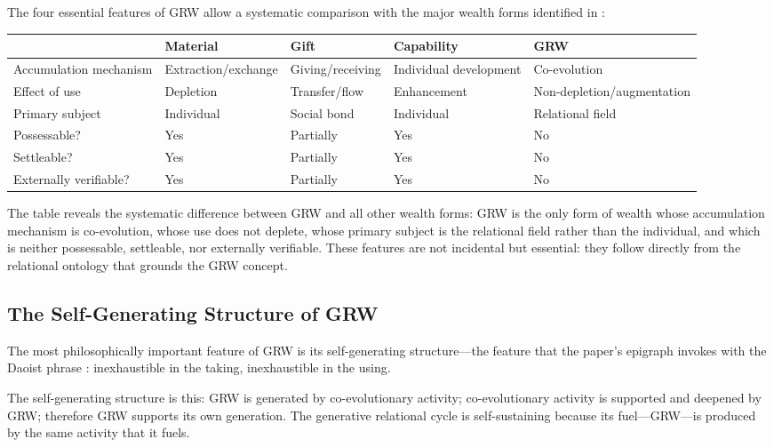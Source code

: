 \noindent
The four essential features of GRW allow a systematic comparison with the major wealth forms identified in :

\vspace{0.6em}
\begin{center}
\begin{tabular}{lllll}
\toprule
& \textbf{Material} & \textbf{Gift} & \textbf{Capability} & \textbf{GRW} \\
\midrule
Accumulation mechanism & Extraction/exchange & Giving/receiving & Individual development & Co-evolution \\
Effect of use & Depletion & Transfer/flow & Enhancement & Non-depletion/augmentation \\
Primary subject & Individual & Social bond & Individual & Relational field \\
Possessable? & Yes & Partially & Yes & No \\
Settleable? & Yes & Partially & Yes & No \\
Externally verifiable? & Yes & Partially & Yes & No \\
\bottomrule
\end{tabular}
\end{center}
\vspace{0.6em}

The table reveals the systematic difference between GRW and all other wealth forms: GRW is the only form of wealth whose accumulation mechanism is co-evolution, whose use does not deplete, whose primary subject is the relational field rather than the individual, and which is neither possessable, settleable, nor externally verifiable. These features are not incidental but essential: they follow directly from the relational ontology that grounds the GRW concept.

\subsection{The Self-Generating Structure of GRW}
\label{p15:subsec:selfgenerating}

\noindent
The most philosophically important feature of GRW is its self-generating structure---the feature that the paper's epigraph invokes with the Daoist phrase : inexhaustible in the taking, inexhaustible in the using.

The self-generating structure is this: GRW is generated by co-evolutionary activity; co-evolutionary activity is supported and deepened by GRW; therefore GRW supports its own generation. The generative relational cycle is self-sustaining because its fuel---GRW---is produced by the same activity that it fuels.

